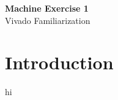 \clearpage
\setcounter{page}{1}

\begin{center}
    \vspace*{3em}
    {\LARGE \textbf{Machine Exercise 1}}\\
    {\vspace{1.5em}}
    {\large Vivado Familiarization}\\
\end{center}

\section{Introduction}
    hi